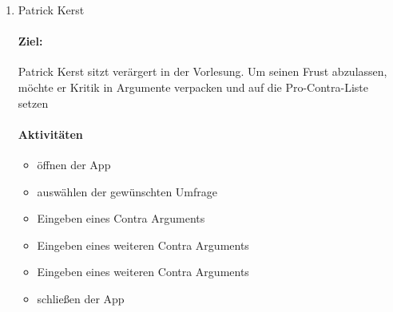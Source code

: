\begin{enumerate}
\item Patrick Kerst

\paragraph{Ziel:} Patrick Kerst sitzt verärgert in der Vorlesung. Um seinen Frust abzulassen, möchte er Kritik in Argumente verpacken und auf die Pro-Contra-Liste setzen

\paragraph{Aktivitäten}
\begin{itemize}
\item öffnen der App
\item auswählen der gewünschten Umfrage
\item Eingeben eines Contra Arguments 
\item Eingeben eines weiteren Contra Arguments 
\item Eingeben eines weiteren Contra Arguments
\item schließen der App 
\end{itemize}
\end{enumerate}

\clearpage